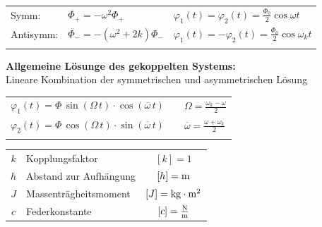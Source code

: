 \begin{tabular}{lll}
Symm: & $\ddot{\Phi_+} = - \omega^2 \Phi_+ $ &  $\varphi_1(t) = \varphi_2(t) = \frac{\Phi_0}{2} \cos{ \omega t} $\\
Antisymm: & $\ddot{\Phi_-} = - (\omega^2 + 2k) \Phi_- $ & $\varphi_1(t) = -\varphi_2(t) = \frac{\Phi_0}{2} \cos{ \omega_k t} $ \\
\\
\end{tabular}





\textbf{Allgemeine Lösunge des gekoppelten Systems:} \\
Lineare Kombination der symmetrischen und asymmetrischen Lösung \\

\renewcommand{\arraystretch}{1.3}
\begin{tabular}{lll}
$\varphi_1(t) = \Phi \, \sin( \Omega\, t) \cdot \cos(\overline{\omega} \, t)$ & & $\Omega = \frac{\omega_k - \omega}{2}$ \\
$\varphi_2(t) = \Phi \, \cos( \Omega\, t) \cdot \sin(\overline{\omega} \, t)$ & & $\overline{\omega} = \frac{\omega + \omega_k}{2}$ \\
\\
\end{tabular}
\renewcommand{\arraystretch}{1}


\begin{tabular}{c l c}
$k$ & Kopplungsfaktor & $[k] = 1$ \\
$h$ & Abstand zur Aufhängung & $[h] = \mathrm{m}$ \\
$J$ & Massenträgheitsmoment & $[J] = \mathrm{kg} \cdot \mathrm{m}^2 $ \\
$c$ & Federkonstante & $[c] = \frac{\mathrm{N}}{\mathrm{m}}$ \\
\end{tabular}


